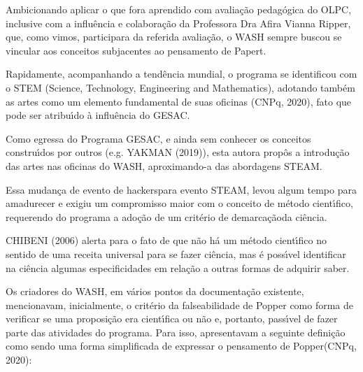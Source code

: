 \documentclass[
12pt,		%
openright,	%
twoside,  %
a4paper,			%
chapter=TITLE,		%
english,			%
french,				%
spanish,			%
brazil				%
]{USPSC-classe/USPSC}
\begin{document}
Ambicionando aplicar o que fora aprendido com avalia\c{c}\~ao pedag\'ogica do OLPC, inclusive com a influ\^encia e colabora\c{c}\~ao da Professora Dra Afira Vianna Ripper, que, como vimos, participara da referida avalia\c{c}\~ao, o WASH sempre buscou se vincular aos conceitos subjacentes ao pensamento de Papert.










Rapidamente, acompanhando a tend\^encia mundial, o programa se identificou com o STEM (Science, Technology, Engineering and Mathematics), adotando tamb\'em as artes como um elemento fundamental de suas oficinas  (CNPq, 2020), fato que pode ser atribu\'{\i}do \`a influ\^encia do GESAC.










Como egressa do Programa GESAC, e ainda sem conhecer os conceitos constru\'{\i}dos por outros (e.g.  YAKMAN (2019)), esta autora prop\^os a introdu\c{c}\~ao das artes nas oficinas do WASH, aproximando-a das abordagens STEAM.










Essa mudan\c{c}a de \textquotedbl evento de hackers\textquotedbl  para \textquotedbl evento STEAM\textquotedbl , levou algum tempo para amadurecer e exigiu um compromisso maior com o conceito de m\'etodo cient\'{\i}fico, requerendo do programa a ado\c{c}\~ao de um \textquotedbl crit\'erio de demarca\c{c}\~ao\textquotedbl  da ci\^encia.










 CHIBENI (2006) alerta para o fato de que \textquotedbl n\~ao h\'a um m\'etodo cient\'{\i}fico no sentido de uma receita universal para se fazer ci\^encia\textquotedbl , mas \'e poss\'{\i}vel identificar na ci\^encia algumas especificidades em rela\c{c}\~ao a outras formas de adquirir saber.










Os criadores do WASH, em v\'arios pontos da documenta\c{c}\~ao existente, mencionavam, inicialmente, o crit\'erio da falseabilidade de Popper como forma de verificar se uma proposi\c{c}\~ao era cient\'{\i}fica ou n\~ao e, portanto, pass\'{\i}vel de fazer parte das atividades do programa. Para isso, apresentavam a seguinte defini\c{c}\~ao como sendo uma \textquotedbl forma simplificada de expressar o pensamento de Popper\textquotedbl   (CNPq, 2020):
\end{document}
